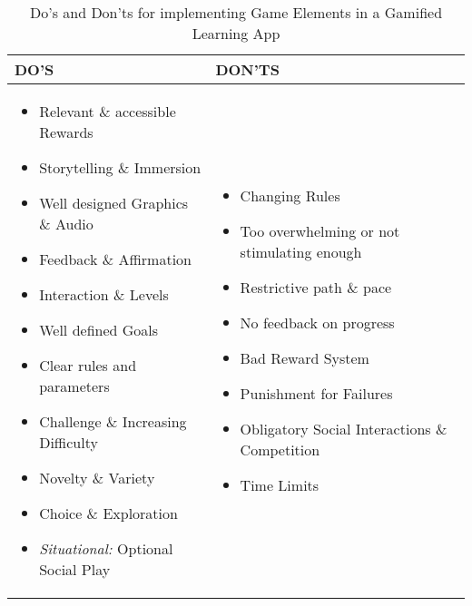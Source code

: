 \renewcommand{\arraystretch}{1.5}
\begin{table}[h]
\centering
\small
\begin{tabular}{ |p{7cm}|p{7cm}|  }
\hline
\textbf{DO'S} & \textbf{DON'TS}\\
\hline
\begin{itemize}
    \item Relevant \& accessible Rewards
    \item Storytelling \& Immersion
    \item Well designed Graphics \& Audio
    \item Feedback \& Affirmation
    \item Interaction \& Levels
    \item Well defined Goals
    \item Clear rules and parameters
    \item Challenge \& Increasing Difficulty
    \item Novelty \& Variety
    \item Choice \& Exploration
    \item \textit{Situational:} Optional Social Play
\end{itemize} &
\begin{itemize}
    \item Changing Rules
    \item Too overwhelming or not stimulating enough
    \item Restrictive path \& pace
    \item No feedback on progress
    \item Bad Reward System
    \item Punishment for Failures
    \item Obligatory Social Interactions \& Competition
    \item Time Limits
\end{itemize} \\
\hline
\end{tabular}
\caption{Do's and Don'ts for implementing Game Elements in a Gamified Learning App}
\label{table:2}
\end{table}